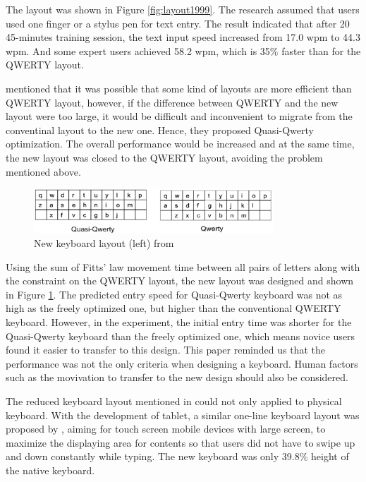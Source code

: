 \documentclass[11pt]{article}
\begin{document}
The layout was shown in Figure \ref{fig:layout1999}. The research assumed that users used one finger or a stylus pen for text entry. The result indicated that after 20 45-minutes training session, the text input speed increased from 17.0 wpm to 44.3 wpm. And some expert users achieved 58.2 wpm, which is 35\% faster than for the QWERTY layout. 

\citet{10.1145/1753326.1753367} mentioned that it was possible that some kind of layouts are more efficient than QWERTY layout, however, if the difference between QWERTY and the new layout were too large, it would be difficult and inconvenient to migrate from the conventinal layout to the new one. Hence, they proposed Quasi-Qwerty optimization. The overall performance would be increased and at the same time, the new layout was closed to the QWERTY layout, avoiding the problem mentioned above. 

\begin{figure}[H]
  \centering
  \includegraphics[width=0.8\textwidth]{Layout2010.png}
  \caption{New keyboard layout (left) from \citep{10.1145/1753326.1753367}}
  \label{fig:layout2010}
\end{figure}

Using the sum of Fitts’ law movement time between all pairs of letters along with the constraint on the QWERTY layout, the new layout was designed and shown in Figure \ref{fig:layout2010}. The predicted entry speed for Quasi-Qwerty keyboard was not as high as the freely optimized one, but higher than the conventional QWERTY keyboard. However, in the experiment, the initial entry time was shorter for the Quasi-Qwerty keyboard than the freely optimized one, which means novice users found it easier to transfer to this design. This paper reminded us that the performance was not the only criteria when designing a keyboard. Human factors such as the movivation to transfer to the new design should also be considered.

The reduced keyboard layout mentioned in \citet{10.1145/985921.986082} could not only applied to physical keyboard. With the development of tablet, a similar one-line keyboard layout was proposed by \citet{10.1145/2047196.2047257}, aiming for touch screen mobile devices with large screen, to maximize the displaying area for contents so that users did not have to swipe up and down constantly while typing. The new keyboard was only 39.8\% height of the native keyboard.
\end{document}
